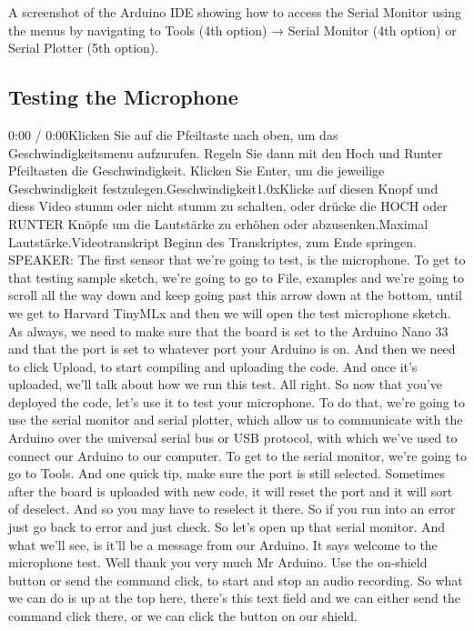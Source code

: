 A screenshot of the Arduino IDE showing how to access the Serial Monitor using the menus by navigating to Tools (4th option) → Serial Monitor (4th option) or Serial Plotter (5th option).

\subsection{Testing the Microphone}

0:00 / 0:00Klicken Sie auf die Pfeiltaste nach oben, um das Geschwindigkeitsmenu aufzurufen. Regeln Sie dann mit den Hoch und Runter Pfeiltasten die Geschwindigkeit. Klicken Sie Enter, um die jeweilige Geschwindigkeit festzulegen.Geschwindigkeit1.0xKlicke auf diesen Knopf und diess Video stumm oder nicht stumm zu schalten, oder drücke die HOCH oder RUNTER Knöpfe um die Lautstärke zu erhöhen oder abzusenken.Maximal Lautstärke.Videotranskript
Beginn des Transkriptes, zum Ende springen.
SPEAKER: The first sensor that we're going to test, is the microphone.
To get to that testing sample sketch, we're going to go to File, examples
and we're going to scroll all the way down and keep
going past this arrow down at the bottom, until we get to Harvard TinyMLx
and then we will open the test microphone sketch.
As always, we need to make sure that the board is set to the Arduino Nano 33
and that the port is set to whatever port your Arduino is on.
And then we need to click Upload, to start compiling and uploading the code.
And once it's uploaded, we'll talk about how we run this test.
All right.
So now that you've deployed the code, let's use it to test your microphone.
To do that, we're going to use the serial monitor and serial
plotter, which allow us to communicate with the Arduino
over the universal serial bus or USB protocol, with which we've used
to connect our Arduino to our computer.
To get to the serial monitor, we're going to go to Tools.
And one quick tip, make sure the port is still selected.
Sometimes after the board is uploaded with new code, it will reset the port
and it will sort of deselect.
And so you may have to reselect it there.
So if you run into an error just go back to error and just check.
So let's open up that serial monitor.
And what we'll see, is it'll be a message from our Arduino.
It says welcome to the microphone test.
Well thank you very much Mr Arduino.
Use the on-shield button or send the command click,
to start and stop an audio recording.
So what we can do is up at the top here, there's this text field
and we can either send the command click there,
or we can click the button on our shield.
